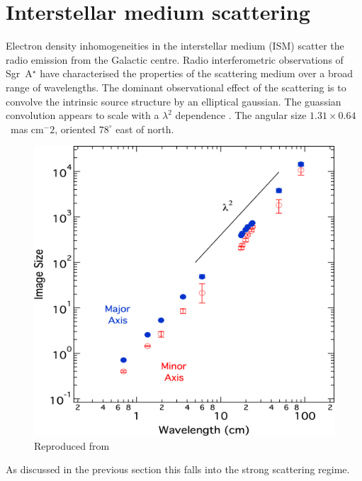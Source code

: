 \section{Interstellar medium scattering}

Electron density inhomogeneities in the interstellar medium (ISM) scatter the radio emission from the Galactic centre.  Radio interferometric observations of Sgr~A$^\star$ have characterised the properties of the scattering medium over a broad range of wavelengths. The dominant observational effect of the scattering is to convolve the intrinsic source structure by an elliptical gaussian.  The guassian convolution appears to scale with a $\lambda^2$ dependence \cite{Backer_1978}. The angular size $1.31 \times 0.64$~mas cm$^-2$, oriented $78^\circ$ east of north. 

\begin{figure}
\begin{center}
\includegraphics[width=1.\columnwidth]{Images/scattering_law}
\caption{Reproduced from \citet{Psaltis_2015} 
}
\end{center}
\end{figure}


As discussed in the previous section this falls into the strong scattering regime. 


